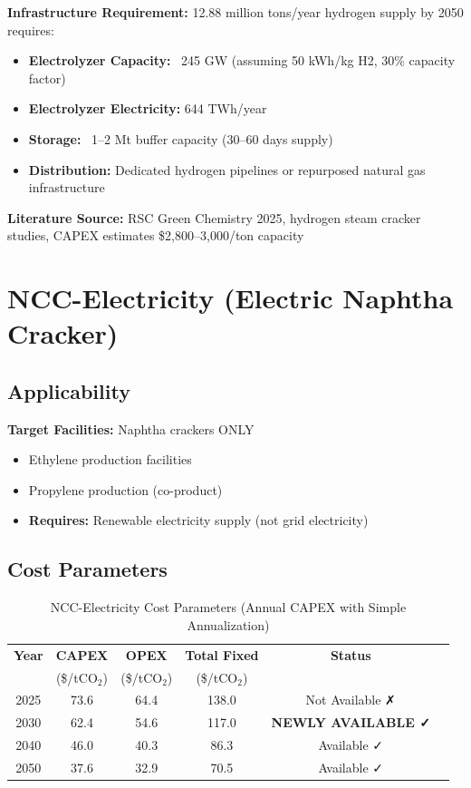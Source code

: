 \documentclass[11pt,a4paper]{report}
\newcommand{\tco}{tCO$_2$}
\begin{document}
\textbf{Infrastructure Requirement:} 12.88 million tons/year hydrogen supply by 2050 requires:
\begin{itemize}[leftmargin=*]
    \item \textbf{Electrolyzer Capacity:} ~245 GW (assuming 50 kWh/kg H2, 30\% capacity factor)
    \item \textbf{Electrolyzer Electricity:} 644 TWh/year
    \item \textbf{Storage:} ~1--2 Mt buffer capacity (30--60 days supply)
    \item \textbf{Distribution:} Dedicated hydrogen pipelines or repurposed natural gas infrastructure
\end{itemize}

\textbf{Literature Source:} RSC Green Chemistry 2025, hydrogen steam cracker studies, CAPEX estimates \$2,800--3,000/ton capacity

\clearpage

\section{NCC-Electricity (Electric Naphtha Cracker)}

\subsection{Applicability}

\textbf{Target Facilities:} Naphtha crackers ONLY
\begin{itemize}[leftmargin=*]
    \item Ethylene production facilities
    \item Propylene production (co-product)
    \item \textbf{Requires:} Renewable electricity supply (not grid electricity)
\end{itemize}

\subsection{Cost Parameters}

\begin{table}[H]
\centering
\caption{NCC-Electricity Cost Parameters (Annual CAPEX with Simple Annualization)}
\begin{tabular}{cccccc}
\toprule
\textbf{Year} & \textbf{CAPEX} & \textbf{OPEX} & \textbf{Total Fixed} & \textbf{Status} \\
 & (\$/\tco) & (\$/\tco) & (\$/\tco) & \\
\midrule
2025 & 73.6 & 64.4 & 138.0 & Not Available ✗ \\
\rowcolor{lightgray}
2030 & 62.4 & 54.6 & 117.0 & \textbf{NEWLY AVAILABLE ✓} \\
2040 & 46.0 & 40.3 & 86.3 & Available ✓ \\
2050 & 37.6 & 32.9 & 70.5 & Available ✓ \\
\bottomrule
\end{tabular}
\label{tab:ncce-costs}
\end{table}
\end{document}
